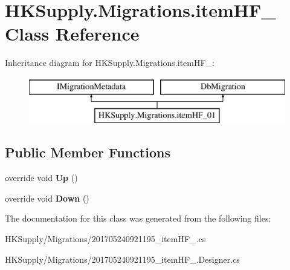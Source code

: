 \hypertarget{class_h_k_supply_1_1_migrations_1_1item_h_f__01}{}\section{H\+K\+Supply.\+Migrations.\+item\+H\+F\+\_ Class Reference}
\label{class_h_k_supply_1_1_migrations_1_1item_h_f__01}
Inheritance diagram for H\+K\+Supply.\+Migrations.\+item\+H\+F\+\_\+:\begin{figure}[H]
\begin{center}
\leavevmode
\includegraphics[height=2.000000cm]{class_h_k_supply_1_1_migrations_1_1item_h_f__01}
\end{center}
\end{figure}
\subsection*{Public Member Functions}
\begin{DoxyCompactItemize}
\item 
\mbox{\label{class_h_k_supply_1_1_migrations_1_1item_h_f__01_ad3fceeab3426df2d234c3818cd0a2569}} 
override void {\bfseries Up} ()
\item 
\mbox{\label{class_h_k_supply_1_1_migrations_1_1item_h_f__01_ae8b9f3939a895e036f2395fed5546edb}} 
override void {\bfseries Down} ()
\end{DoxyCompactItemize}


The documentation for this class was generated from the following files\+:\begin{DoxyCompactItemize}
\item 
H\+K\+Supply/\+Migrations/201705240921195\+\_\+item\+H\+F\+\_.\+cs\item 
H\+K\+Supply/\+Migrations/201705240921195\+\_\+item\+H\+F\+\_.\+Designer.\+cs\end{DoxyCompactItemize}
